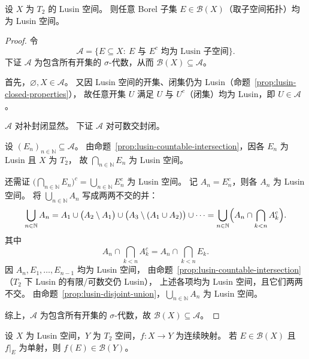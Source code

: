 \documentclass[lang=cn,a4paper,newtx,figureplace=section,tableplace=section]{elegantbook}
\begin{document}
\begin{theorem}\label{thm:borel-lusin}
  设 $X$ 为 $T_2$ 的 Lusin 空间。
  则任意 Borel 子集 $E\in\mathcal{B}(X)$（取子空间拓扑）均为 Lusin 空间。
\end{theorem}

\begin{proof}
  令
  \[
    \mathcal{A}=\{E\subseteq X:\ E\text{ 与 }E^c\text{ 均为 Lusin 子空间}\}.
  \]
  下证 $\mathcal{A}$ 为包含所有开集的 $\sigma$-代数，从而 $\mathcal{B}(X)\subseteq\mathcal{A}$。

  首先，$\varnothing,X\in\mathcal{A}$。
  又因 Lusin 空间的开集、闭集仍为 Lusin（命题~\ref{prop:lusin-closed-properties}），
  故任意开集 $U$ 满足 $U$ 与 $U^c$（闭集）均为 Lusin，即 $U\in\mathcal{A}$。

  $\mathcal{A}$ 对补封闭显然。
  下证 $\mathcal{A}$ 对可数交封闭。

  设 $(E_n)_{n\in\mathbb{N}}\subseteq\mathcal{A}$。
  由命题~\ref{prop:lusin-countable-intersection}，因各 $E_n$ 为 Lusin 且 $X$ 为 $T_2$，
  故 $\bigcap_{n\in\mathbb{N}}E_n$ 为 Lusin 空间。

  还需证 $\bigl(\bigcap_{n\in\mathbb{N}}E_n\bigr)^c=\bigcup_{n\in\mathbb{N}}E_n^c$ 为 Lusin 空间。
  记 $A_n=E_n^c$，则各 $A_n$ 为 Lusin 空间。
  将 $\bigcup_{n\in\mathbb{N}}A_n$ 写成两两不交的并：
  \[
    \bigcup_{n\in\mathbb{N}}A_n=A_1\cup\bigl(A_2\setminus A_1\bigr)\cup\bigl(A_3\setminus(A_1\cup A_2)\bigr)\cup\cdots
    =\bigcup_{n\in\mathbb{N}}\Bigl(A_n\cap\bigcap_{k<n}A_k^c\Bigr).
  \]
  其中
  \[
    A_n\cap\bigcap_{k<n}A_k^c=A_n\cap\bigcap_{k<n}E_k.
  \]
  因 $A_n,E_1,\dotsc,E_{n-1}$ 均为 Lusin 空间，
  由命题~\ref{prop:lusin-countable-intersection}（$T_2$ 下 Lusin 的有限/可数交仍 Lusin），
  上述各项均为 Lusin 空间，且它们两两不交。
  由命题~\ref{prop:lusin-disjoint-union}，$\bigcup_{n\in\mathbb{N}}A_n$ 为 Lusin 空间。

  综上，$\mathcal{A}$ 为包含所有开集的 $\sigma$-代数，故 $\mathcal{B}(X)\subseteq\mathcal{A}$。
\end{proof}

\begin{theorem}\label{thm:lusin-continuous-injection-borel}
  设 $X$ 为 Lusin 空间，$Y$ 为 $T_2$ 空间，$f:X\to Y$ 为连续映射。
  若 $E\in\mathcal{B}(X)$ 且 $f|_E$ 为单射，则 $f(E)\in\mathcal{B}(Y)$。
\end{theorem}
\end{document}
